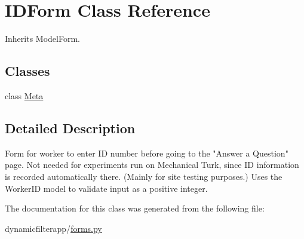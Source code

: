 \hypertarget{classdynamicfilterapp_1_1forms_1_1_i_d_form}{}\section{I\+D\+Form Class Reference}
\label{classdynamicfilterapp_1_1forms_1_1_i_d_form}


Inherits Model\+Form.

\subsection*{Classes}
\begin{DoxyCompactItemize}
\item 
class \hyperlink{classdynamicfilterapp_1_1forms_1_1_i_d_form_1_1_meta}{Meta}
\end{DoxyCompactItemize}


\subsection{Detailed Description}
\begin{DoxyVerb}Form for worker to enter ID number before going to the "Answer a Question" 
page. Not needed for experiments run on Mechanical Turk, since ID information 
is recorded automatically there. (Mainly for site testing purposes.)
Uses the WorkerID model to validate input as a positive integer.
\end{DoxyVerb}
 

The documentation for this class was generated from the following file\+:\begin{DoxyCompactItemize}
\item 
dynamicfilterapp/\hyperlink{forms_8py}{forms.\+py}\end{DoxyCompactItemize}
